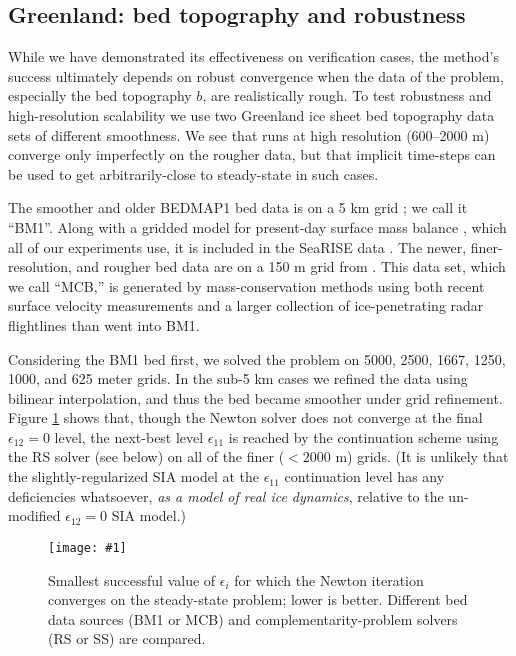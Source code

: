 \documentclass[twocolumn,letterpaper]{igs}
\newcommand{\onecol}[1]{\texttt{[image: \#1]}}
\newcommand\eps{\epsilon}
\begin{document}
\subsection{Greenland: bed topography and robustness}

While we have demonstrated its effectiveness on verification cases, the method's success ultimately depends on robust convergence when the data of the problem, especially the bed topography $b$, are realistically rough.  To test robustness and high-resolution scalability we use two Greenland ice sheet bed topography data sets of different smoothness.  We see that runs at high resolution (600--2000 m) converge only imperfectly on the rougher data, but that implicit time-steps can be used to get arbitrarily-close to steady-state in such cases.

\newcommand{\BM}{\textsf{BM1}\xspace}
\newcommand{\MCB}{\textsf{MCB}\xspace}
\newcommand{\virs}{\textsf{RS}\xspace}
\newcommand{\viss}{\textsf{SS}\xspace}

The smoother and older BEDMAP1 bed data is on a 5 km grid \citep{Bamberetal2001}; we call it ``\BM''.  Along with a gridded model for present-day surface mass balance \citep{Ettemaetal2009}, which all of our experiments use, it is included in the SeaRISE data \citep{Bindschadleretal2013}.  The newer, finer-resolution, and rougher bed data are on a 150 m grid from \cite{Morlighemetal2014}.  This data set, which we call ``\MCB,'' is generated by mass-conservation methods using both recent surface velocity measurements and a larger collection of ice-penetrating radar flightlines than went into \BM.

Considering the \BM bed first, we solved the problem on 5000, 2500, 1667, 1250, 1000, and 625 meter grids.  In the sub-5 km cases we refined the data using bilinear interpolation, and thus the bed became smoother under grid refinement.  Figure \ref{fig:grnrobusteps} shows that, though the Newton solver does not converge at the final $\eps_{12}=0$ level, the next-best level $\eps_{11}$ is reached by the continuation scheme using the \virs solver (see below) on all of the finer ($<2000$ m) grids.  (It is unlikely that the slightly-regularized SIA model at the $\eps_{11}$ continuation level has any deficiencies whatsoever, \emph{as a model of real ice dynamics}, relative to the un-modified $\eps_{12}=0$ SIA model.)

\begin{figure}[ht]
\onecol{grnrobusteps.pdf}
\caption{Smallest successful value of $\eps_i$ for which the Newton iteration converges on the steady-state problem; lower is better.  Different bed data sources (\BM or \MCB) and complementarity-problem solvers (\virs or \viss) are compared.}
\label{fig:grnrobusteps}
\end{figure}
\end{document}
